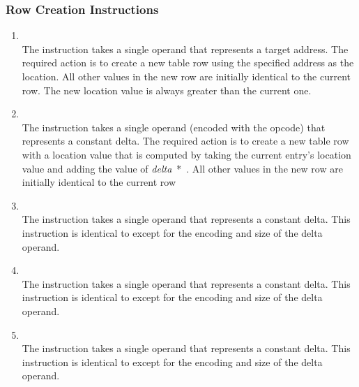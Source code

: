 \subsubsection{Row Creation Instructions}
\label{chap:rowcreationinstructions}
\begin{enumerate}[1. ]

\item \textbf{\DWCFAsetlocTARG} \\
The \DWCFAsetlocNAME{} instruction 
takes a single operand that
represents a target address. The required action is to create a
new table row using the specified address as the location. All
other values in the new row are initially identical to the
current row. The new location value is always greater than
the current one.
\db 

\item \textbf{\DWCFAadvancelocTARG} \\
The \DWCFAadvancelocNAME{} instruction takes a single operand (encoded
with the opcode) that represents a constant delta. The required
action is to create a new table row with a location value that
is computed by taking the current entry\textquoteright s location value
and adding the value of 
\mbox{\textit{delta} * }. 
All other values in the new row are initially identical to the
current row

\item \textbf{\DWCFAadvanceloconeTARG{}} \\
The \DWCFAadvanceloconeNAME{} instruction takes a single \HFTubyte{}
operand that represents a constant delta. This instruction
is identical to \DWCFAadvanceloc{} except for the encoding
and size of the delta operand.

\item \textbf{\DWCFAadvanceloctwoTARG} \\
The \DWCFAadvanceloctwoNAME{} instruction takes a single \HFTuhalf{}
operand that represents a constant delta. This instruction
is identical to \DWCFAadvanceloc{} except for the encoding
and size of the delta operand.

\item \textbf{\DWCFAadvancelocfourTARG} \\
The \DWCFAadvancelocfourNAME{} instruction takes a single \HFTuword{}
operand that represents a constant delta. This instruction
is identical to \DWCFAadvanceloc{} except for the encoding
and size of the delta operand.

\end{enumerate}

